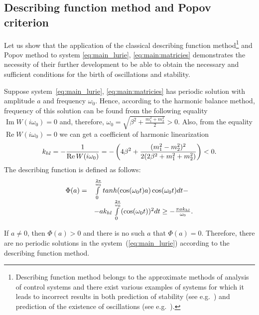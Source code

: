 \documentclass{ifacconf}
\theoremstyle{plain}
\begin{document}
\subsection{Describing function method and Popov criterion}
Let us show that the application of the classical describing function method\footnote{
  Describing function method belongs
  to the approximate methods of analysis of control systems
  and there exist various examples of systems for which it
  leads to incorrect results
  in both prediction of stability (see e.g.~\citep{BraginVKL-2011,LeonovK-2013-IJBC})
  and prediction of the existence of oscillations
  (see e.g.~\citep{LeonovK-2018-AIP,LeonovK-2018-DAN}).
} and Popov method
to system \eqref{eq:main_lurie}, \eqref{eq:main:matricies} demonstrates the necessity
of their further development to be able to obtain
the necessary and sufficient conditions for the
birth of oscillations and stability.

Suppose system~\eqref{eq:main_lurie}, \eqref{eq:main:matricies} has periodic solution
with amplitude $a$ and frequency $\omega_0$.
Hence, according to the harmonic balance method, frequency of this solution can be found
from the following equality $\operatorname{Im} W(i\omega_0) = 0$
and, therefore, $\omega_0 = \sqrt{\beta^2+\frac{m_1^2+m_2^2}{2}} > 0$.
Also, from the equality $\operatorname{Re} W(i\omega_0) = 0$
we can get a coefficient of harmonic linearization
\begin{equation*}
	k_{\rm hl} = -\frac{1}{\operatorname{Re} W(i\omega_0)} = - \left(4 \beta^2 + \frac{(m_1^2 - m_2^2)^2}{2 (2\beta^2 + m_1^2 + m_2^2)}\right) < 0.
\end{equation*}
The describing function is defined as follows:
\begin{equation}
		\begin{array}{ll}
			\Phi(a) =&  \int\limits_{0}^{\frac{2\pi}{\omega_0}} {\rm tanh} (\cos(\omega_0t)a)\cos(\omega_0t)dt - \\
			& - ak_{\rm hl}\int\limits_{0}^{\frac{2\pi}{\omega_0}}(\cos(\omega_0t))^2dt \geq -\frac{\pi ak_{\rm hl}}{\omega_0}.
		\end{array}
\end{equation}

If $a \neq 0$, then $\Phi(a) > 0$ and there is no such $a$ that $\Phi(a) = 0$.
Therefore, there are no periodic solutions in the system~(\ref{eq:main_lurie})
according to the describing function method.
\end{document}
